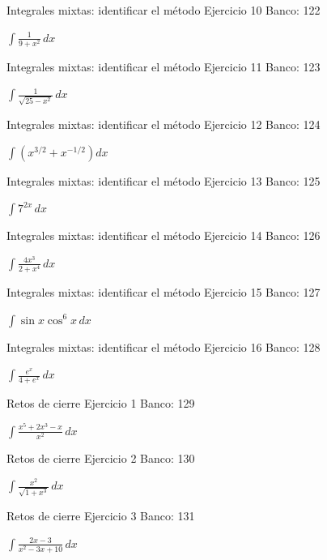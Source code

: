 \documentclass[aspectratio=169,12pt]{beamer}
\newcommand{\ejercicio}[1]{%
  \begin{center}
  \vfill
  {\fontsize{24}{30}\selectfont #1}
  \vfill
  \end{center}
}
\begin{document}
\begin{frame}{Integrales mixtas: identificar el método}
\small Ejercicio 10 \hfill Banco: 122
\ejercicio{$\displaystyle \int\frac{1}{9+x^2}\,dx$}
\end{frame}

\begin{frame}{Integrales mixtas: identificar el método}
\small Ejercicio 11 \hfill Banco: 123
\ejercicio{$\displaystyle \int\frac{1}{\sqrt{25-x^2}}\,dx$}
\end{frame}

\begin{frame}{Integrales mixtas: identificar el método}
\small Ejercicio 12 \hfill Banco: 124
\ejercicio{$\displaystyle \int\left(x^{3/2}+x^{-1/2}\right)dx$}
\end{frame}

\begin{frame}{Integrales mixtas: identificar el método}
\small Ejercicio 13 \hfill Banco: 125
\ejercicio{$\displaystyle \int 7^{2x}\,dx$}
\end{frame}

\begin{frame}{Integrales mixtas: identificar el método}
\small Ejercicio 14 \hfill Banco: 126
\ejercicio{$\displaystyle \int\frac{4x^3}{2+x^4}\,dx$}
\end{frame}

\begin{frame}{Integrales mixtas: identificar el método}
\small Ejercicio 15 \hfill Banco: 127
\ejercicio{$\displaystyle \int\sin x\cos^6x\,dx$}
\end{frame}

\begin{frame}{Integrales mixtas: identificar el método}
\small Ejercicio 16 \hfill Banco: 128
\ejercicio{$\displaystyle \int\frac{e^x}{4+e^x}\,dx$}
\end{frame}

\begin{frame}{Retos de cierre}
\small Ejercicio 1 \hfill Banco: 129
\ejercicio{$\displaystyle \int\frac{x^5+2x^3-x}{x^2}\,dx$}
\end{frame}

\begin{frame}{Retos de cierre}
\small Ejercicio 2 \hfill Banco: 130
\ejercicio{$\displaystyle \int\frac{x^2}{\sqrt{1+x^3}}\,dx$}
\end{frame}

\begin{frame}{Retos de cierre}
\small Ejercicio 3 \hfill Banco: 131
\ejercicio{$\displaystyle \int\frac{2x-3}{x^2-3x+10}\,dx$}
\end{frame}
\end{document}

